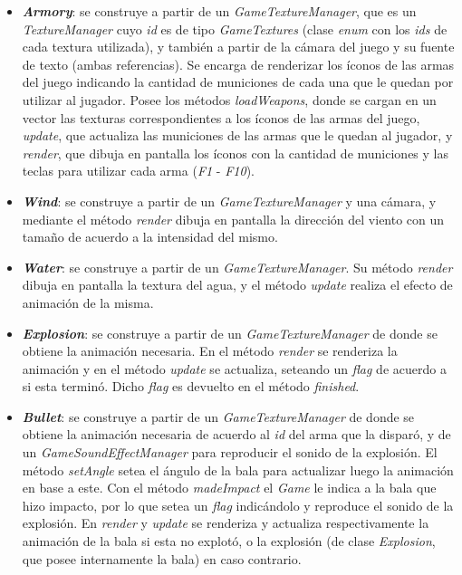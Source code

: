 \begin{itemize}
	\item \textbf{\textit{Armory}}: se construye a partir de un \textit{GameTextureManager}, que es un \textit{TextureManager} cuyo \textit{id} es de tipo \textit{GameTextures} (clase \textit{enum} con los \textit{ids} de cada textura utilizada), y también a partir de la cámara del juego y su fuente de texto (ambas referencias). Se encarga de renderizar los íconos de las armas del juego indicando la cantidad de municiones de cada una que le quedan por utilizar al jugador. Posee los métodos \textit{loadWeapons}, donde se cargan en un vector las texturas correspondientes a los íconos de las armas del juego, \textit{update}, que actualiza las municiones de las armas que le quedan al jugador, y \textit{render}, que dibuja en pantalla los íconos con la cantidad de municiones y las teclas para utilizar cada arma (\textit{F1} - \textit{F10}).

	\item \textbf{\textit{Wind}}: se construye a partir de un \textit{GameTextureManager} y una cámara, y mediante el método \textit{render} dibuja en pantalla la dirección del viento con un tamaño de acuerdo a la intensidad del mismo.

	\item \textbf{\textit{Water}}: se construye a partir de un \textit{GameTextureManager}. Su método \textit{render} dibuja en pantalla la textura del agua, y el método \textit{update} realiza el efecto de animación de la misma.

	\item \textbf{\textit{Explosion}}: se construye a partir de un \textit{GameTextureManager} de donde se obtiene la animación necesaria. En el método \textit{render} se renderiza la animación y en el método \textit{update} se actualiza, seteando un \textit{flag} de acuerdo a si esta terminó. Dicho \textit{flag} es devuelto en el método \textit{finished}.

	\item \textbf{\textit{Bullet}}: se construye a partir de un \textit{GameTextureManager} de donde se obtiene la animación necesaria de acuerdo al \textit{id} del arma que la disparó, y de un \textit{GameSoundEffectManager} para reproducir el sonido de la explosión. El método \textit{setAngle} setea el ángulo de la bala para actualizar luego la animación en base a este. Con el método \textit{madeImpact} el \textit{Game} le indica a la bala que hizo impacto, por lo que setea un \textit{flag} indicándolo y reproduce el sonido de la explosión. En \textit{render} y \textit{update} se renderiza y actualiza respectivamente la animación de la bala si esta no explotó, o la explosión (de clase \textit{Explosion}, que posee internamente la bala) en caso contrario.


\end{itemize}
